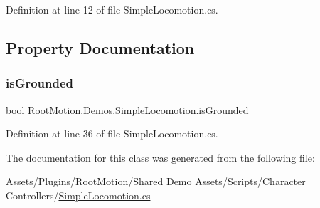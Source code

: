 Definition at line 12 of file Simple\+Locomotion.\+cs.



\subsection{Property Documentation}
\mbox{\label{class_root_motion_1_1_demos_1_1_simple_locomotion_abcfdfe85dfbf484514046a6de7d02cb3}} 
\subsubsection{\texorpdfstring{is\+Grounded}{isGrounded}}
{\footnotesize\ttfamily bool Root\+Motion.\+Demos.\+Simple\+Locomotion.\+is\+Grounded\hspace{0.3cm}{\ttfamily [get]}}



Definition at line 36 of file Simple\+Locomotion.\+cs.



The documentation for this class was generated from the following file\+:\begin{DoxyCompactItemize}
\item 
Assets/\+Plugins/\+Root\+Motion/\+Shared Demo Assets/\+Scripts/\+Character Controllers/\mbox{\hyperlink{_simple_locomotion_8cs}{Simple\+Locomotion.\+cs}}\end{DoxyCompactItemize}
